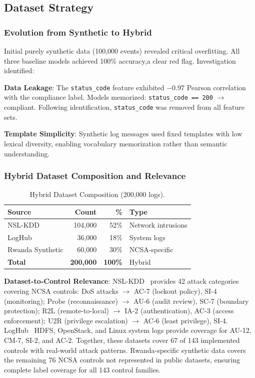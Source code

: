 \documentclass[futureinternet,article,submit,pdftex,moreauthors]{Definitions/mdpi}
\begin{document}
\subsection{Dataset Strategy}

\subsubsection{Evolution from Synthetic to Hybrid}

Initial purely synthetic data (100{,}000 events) revealed critical overfitting. All three
baseline models achieved 100\% accuracy,a clear red flag. Investigation identified:

\textbf{Data Leakage}: The \texttt{status\_code} feature exhibited $-0.97$ Pearson correlation
with the compliance label. Models memorized: \texttt{status\_code == 200} $\rightarrow$
compliant. Following identification, \texttt{status\_code} was removed from all feature sets.

\textbf{Template Simplicity}: Synthetic log messages used fixed templates with low lexical
diversity, enabling vocabulary memorization rather than semantic understanding.

\subsubsection{Hybrid Dataset Composition and Relevance}

\begin{table}[H]
\caption{Hybrid Dataset Composition (200{,}000 logs).\label{tab:dataset}}
\begin{tabularx}{\textwidth}{lrrX}
\toprule
\textbf{Source} & \textbf{Count} & \textbf{\%} & \textbf{Type} \\
\midrule
NSL-KDD~\cite{nslkdd} & 104{,}000 & 52\% & Network intrusions \\
LogHub~\cite{loghub} & 36{,}000 & 18\% & System logs \\
Rwanda Synthetic & 60{,}000 & 30\% & NCSA-specific \\
\midrule
\textbf{Total} & \textbf{200{,}000} & \textbf{100\%} & Hybrid \\
\bottomrule
\end{tabularx}
\end{table}

\textbf{Dataset-to-Control Relevance}: NSL-KDD~\cite{nslkdd} provides 42 attack categories
covering NCSA controls: DoS attacks $\rightarrow$ AC-7 (lockout policy), SI-4 (monitoring);
Probe (reconnaissance) $\rightarrow$ AU-6 (audit review), SC-7 (boundary protection);
R2L (remote-to-local) $\rightarrow$ IA-2 (authentication), AC-3 (access enforcement);
U2R (privilege escalation) $\rightarrow$ AC-6 (least privilege), SI-4. LogHub~\cite{loghub}
HDFS, OpenStack, and Linux system logs provide coverage for AU-12, CM-7, SI-2, and AC-2.
Together, these datasets cover 67 of 143 implemented controls with real-world attack patterns.
Rwanda-specific synthetic data covers the remaining 76 NCSA controls not represented in
public datasets, ensuring complete label coverage for all 143 control families.
\end{document}
